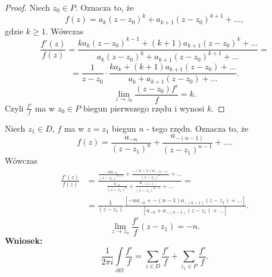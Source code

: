 \documentclass[../main.tex]{subfiles}
\begin{document}
\begin{proof}
    Niech $z_0\in P$. Oznacza to, że
    \[
        f(z) = a_k (z-z_0)^k + a_{k+1} (z-z_0)^{k+1} + \ldots
    ,\]
gdzie $k \ge 1$. Wówczas
\[
    \frac{f'(z)}{f(z)} = \frac{ka_k(z-z_0)^{k-1} + (k+1)a_{k+1}(z-z_0)^k + \ldots}{a_k(z-z_0)^k + a_{k+1}(z-z_0)^{k+1} + \ldots} =
\]
\[
    = \frac{1}{z-z_0}\cdot \frac{ka_k + (k+1)a_{k+1}(z-z_0) + \ldots}{a_k + a_{k+ 1}(z-z_0) + \ldots}
.\]
\[
    \lim\limits_{z\to z_0} \frac{(z-z_0)f'}{f} = k
.\]
Czyli $\frac{f'}{f}$ ma w $z_0\in P$ biegun pierwszego rzędu i wynosi $k$.
\end{proof}
Niech $z_1\in D$, $f$ ma w $z = z_1$ biegun $n$ - tego rzędu. Oznacza to, że
\[
    f(z) = \frac{a_{-n}}{(z-z_1)^n} + \frac{a_{-(n-1)}}{(z-z_1)^{n-1}} + \ldots
.\]
Wówczas
\begin{align*}
    \frac{f'(z)}{f(z)} &= \frac{\frac{-na_{-n}}{(z-z_1)^{n+1}} + \frac{-(n-1)a_{-(n-1)}}{(z-z_1)^n} + \ldots }{\frac{a_{-n}}{(z-z_1)^n} + \frac{a_{-(n-1)}}{(z-z_1)^{n-1}} + \ldots} =\\
    &= \frac{1}{(z-z_1)}\frac{\left[ -na_{-n} + -(n-1)a_{-(n-1)}(z-z_1) + \ldots \right] }{\left[ a_{-n} + a_{-(n-1)}(z-z_1) + \ldots \right] }
.\end{align*}
\[
    \lim\limits_{z\to z_n}\frac{f'}{f} (z-z_1) = -n
.\]
\textbf{Wniosek:}
\[
    \frac{1}{2\pi i}\int\limits_{\partial \Omega}\frac{f'}{f} = \sum_{z\in D} \frac{f'}{f} + \sum_{z_1\in P} \frac{f'}{f}
.\]
\end{document}
